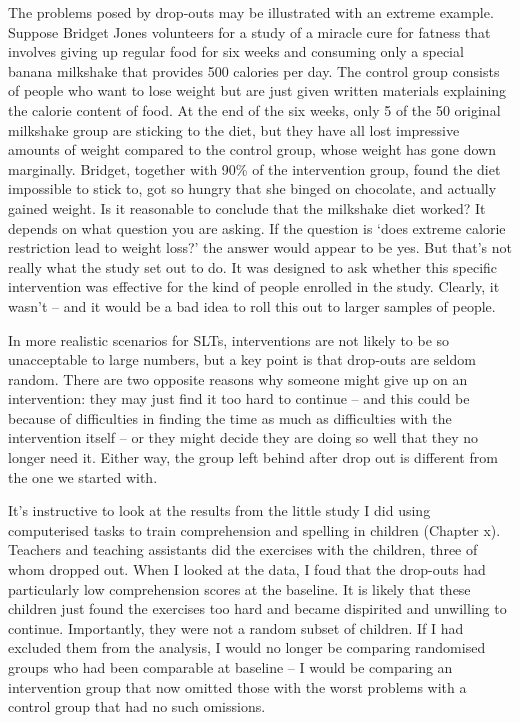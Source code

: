 \documentclass[]{book}
\begin{document}
The problems posed by drop-outs may be illustrated with an extreme example. Suppose Bridget Jones volunteers for a study of a miracle cure for fatness that involves giving up regular food for six weeks and consuming only a special banana milkshake that provides 500 calories per day. The control group consists of people who want to lose weight but are just given written materials explaining the calorie content of food. At the end of the six weeks, only 5 of the 50 original milkshake group are sticking to the diet, but they have all lost impressive amounts of weight compared to the control group, whose weight has gone down marginally. Bridget, together with 90\% of the intervention group, found the diet impossible to stick to, got so hungry that she binged on chocolate, and actually gained weight. Is it reasonable to conclude that the milkshake diet worked? It depends on what question you are asking. If the question is `does extreme calorie restriction lead to weight loss?' the answer would appear to be yes. But that's not really what the study set out to do. It was designed to ask whether this specific intervention was effective for the kind of people enrolled in the study. Clearly, it wasn't -- and it would be a bad idea to roll this out to larger samples of people.

In more realistic scenarios for SLTs, interventions are not likely to be so unacceptable to large numbers, but a key point is that drop-outs are seldom random. There are two opposite reasons why someone might give up on an intervention: they may just find it too hard to continue -- and this could be because of difficulties in finding the time as much as difficulties with the intervention itself -- or they might decide they are doing so well that they no longer need it. Either way, the group left behind after drop out is different from the one we started with.

It's instructive to look at the results from the little study I did using computerised tasks to train comprehension and spelling in children (Chapter x). Teachers and teaching assistants did the exercises with the children, three of whom dropped out. When I looked at the data, I foud that the drop-outs had particularly low comprehension scores at the baseline. It is likely that these children just found the exercises too hard and became dispirited and unwilling to continue. Importantly, they were not a random subset of children. If I had excluded them from the analysis, I would no longer be comparing randomised groups who had been comparable at baseline -- I would be comparing an intervention group that now omitted those with the worst problems with a control group that had no such omissions.
\end{document}
